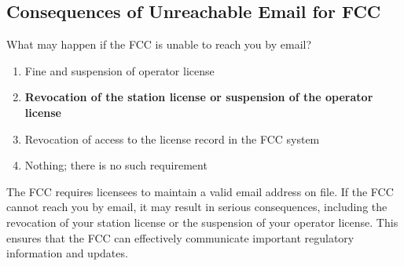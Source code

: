 \subsection{Consequences of Unreachable Email for FCC}
\label{T1C04}

\begin{tcolorbox}[colback=gray!10!white,colframe=black!75!black,title=T1C04]
What may happen if the FCC is unable to reach you by email?
\begin{enumerate}[label=\Alph*,noitemsep]
    \item Fine and suspension of operator license
    \item \textbf{Revocation of the station license or suspension of the operator license}
    \item Revocation of access to the license record in the FCC system
    \item Nothing; there is no such requirement
\end{enumerate}
\end{tcolorbox}

The FCC requires licensees to maintain a valid email address on file. If the FCC cannot reach you by email, it may result in serious consequences, including the revocation of your station license or the suspension of your operator license. This ensures that the FCC can effectively communicate important regulatory information and updates.